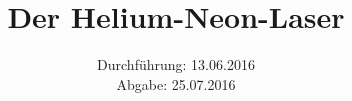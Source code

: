 

\subject{Versuch 61}
\title{Der Helium-Neon-Laser}
\date{Durchführung: 13.06.2016\\
      Abgabe: 25.07.2016}



\maketitle
\newpage







\printbibliography


